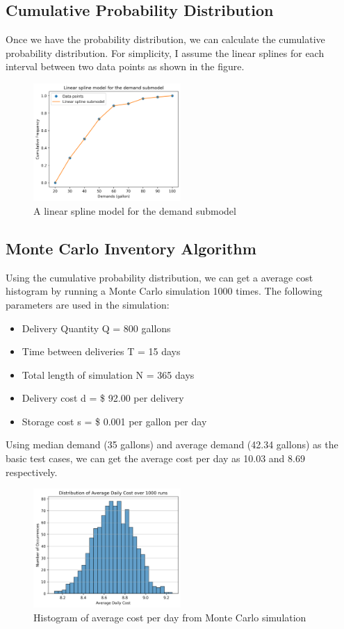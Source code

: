 \documentclass[11pt]{article}
\begin{document}
\subsection{Cumulative Probability Distribution}
Once we have the probability distribution, we can calculate the cumulative probability distribution. For simplicity, I assume the linear splines for each interval between two data points as shown in the figure.

\begin{figure}[H]
    \centering
    \includegraphics[width=0.5\textwidth]{interpolation}
    \caption{A linear spline model for the demand submodel}
    \label{fit}
\end{figure}

\subsection{Monte Carlo Inventory Algorithm}
Using the cumulative probability distribution, we can get a average cost histogram by running a Monte Carlo simulation 1000 times. The following parameters are used in the simulation:
\begin{itemize}
    \item Delivery Quantity Q = 800 gallons
    \item Time between deliveries T = 15 days
    \item Total length of simulation N = 365 days
    \item Delivery cost d = \$ 92.00 per delivery
    \item Storage cost s = \$ 0.001 per gallon per day
\end{itemize}

Using median demand (35 gallons) and average demand (42.34 gallons) as the basic test cases, we can get the average cost per day as 10.03 and 8.69 respectively.

\begin{figure}[H]
    \centering
    \includegraphics[width=0.5\textwidth]{cost_histogram}
    \caption{Histogram of average cost per day from Monte Carlo simulation}
    \label{average_cost}
\end{figure}
\end{document}
